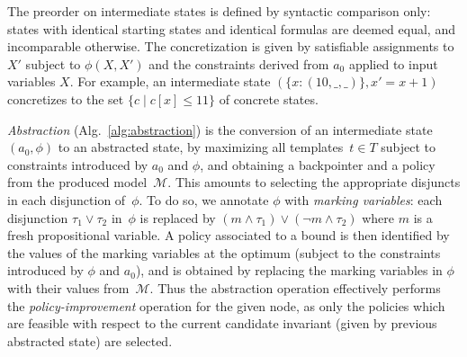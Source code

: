 \documentclass{llncs}
\newcommand{\tuple}[1]{\ensuremath{\left( #1 \right) }}
\begin{document}
The preorder on intermediate states is defined by syntactic comparison only:
states with identical starting states and identical formulas are deemed equal,
and incomparable otherwise.
The concretization is given by satisfiable assignments to $X'$
subject to $\phi(X,X')$
and the constraints derived from $a_0$ applied to input variables $X$.
For example, an intermediate state $\tuple{\{ x: \tuple{10, \_, \_} \}, x'=x+1}$
concretizes to the set $\{ c \mid c[x] \leq 11 \}$ of concrete states.

\emph{Abstraction} (Alg.~\ref{alg:abstraction})
is the conversion of an intermediate state~$\tuple{a_0, \phi}$ to
an abstracted state, by maximizing all templates~$t\in T$
subject to constraints introduced by $a_0$ and $\phi$,
and obtaining a backpointer and a policy from the produced model~$\mathcal{M}$.
This amounts to selecting the appropriate disjuncts in each disjunction of~$\phi$.
To do so, we annotate $\phi$ with \emph{marking variables}:
each disjunction $\tau_1 \lor \tau_2$ in~$\phi$ is replaced by $(m \land \tau_1)
\lor (\lnot m \land \tau_2)$ where $m$ is a fresh propositional variable.
A policy associated to a bound is then identified by the
values of the marking variables at the optimum (subject to the constraints
introduced by $\phi$ and $a_0$),
and is obtained by replacing the marking variables in $\phi$ with their values
from~$\mathcal{M}$.
Thus the abstraction operation effectively performs the \emph{policy-improvement}
operation for the given node, as only the policies which are
feasible with respect to the current candidate invariant (given by previous
abstracted state) are selected.
\end{document}
